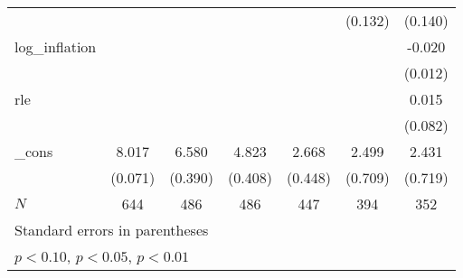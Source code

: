 {\begin{tabular}{l*{6}{c}}
            &                     &                     &                     &                     &     (0.132)         &     (0.140)         \\
\addlinespace
log\_inflation&                     &                     &                     &                     &                     &      -0.020\sym{*}  \\
            &                     &                     &                     &                     &                     &     (0.012)         \\
\addlinespace
rle         &                     &                     &                     &                     &                     &       0.015         \\
            &                     &                     &                     &                     &                     &     (0.082)         \\
\addlinespace
\_cons      &       8.017\sym{***}&       6.580\sym{***}&       4.823\sym{***}&       2.668\sym{***}&       2.499\sym{***}&       2.431\sym{***}\\
            &     (0.071)         &     (0.390)         &     (0.408)         &     (0.448)         &     (0.709)         &     (0.719)         \\
\midrule
\(N\)       &         644         &         486         &         486         &         447         &         394         &         352         \\
\bottomrule
\multicolumn{7}{l}{\footnotesize Standard errors in parentheses}\\
\multicolumn{7}{l}{\footnotesize \sym{*} \(p<0.10\), \sym{**} \(p<0.05\), \sym{***} \(p<0.01\)}\\
\end{tabular}
}
